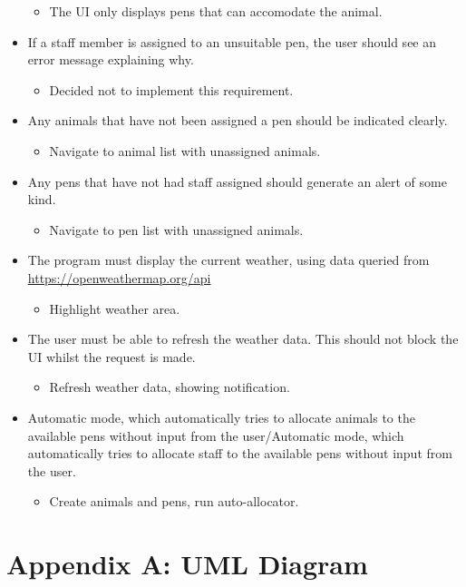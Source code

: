 \documentclass[english,a4paper,]{report}
\providecommand{\tightlist}{%
  \setlength{\itemsep}{0pt}\setlength{\parskip}{0pt}}
\begin{document}
\begin{itemize}
  \begin{itemize}
  \tightlist
  \item
    The UI only displays pens that can accomodate the animal.
  \end{itemize}
\item
  If a staff member is assigned to an unsuitable pen, the user should
  see an error message explaining why.

  \begin{itemize}
  \tightlist
  \item
    Decided not to implement this requirement.
  \end{itemize}
\item
  Any animals that have not been assigned a pen should be indicated
  clearly.

  \begin{itemize}
  \tightlist
  \item
    Navigate to animal list with unassigned animals.
  \end{itemize}
\item
  Any pens that have not had staff assigned should generate an alert of
  some kind.

  \begin{itemize}
  \tightlist
  \item
    Navigate to pen list with unassigned animals.
  \end{itemize}
\item
  The program must display the current weather, using data queried from
  \url{https://openweathermap.org/api}

  \begin{itemize}
  \tightlist
  \item
    Highlight weather area.
  \end{itemize}
\item
  The user must be able to refresh the weather data. This should not
  block the UI whilst the request is made.

  \begin{itemize}
  \tightlist
  \item
    Refresh weather data, showing notification.
  \end{itemize}
\item
  Automatic mode, which automatically tries to allocate animals to the
  available pens without input from the user/Automatic mode, which
  automatically tries to allocate staff to the available pens without
  input from the user.

  \begin{itemize}
  \tightlist
  \item
    Create animals and pens, run auto-allocator.
  \end{itemize}
\end{itemize}

\hypertarget{appendix-a-uml-diagram}{%
\chapter{Appendix A: UML Diagram}\label{appendix-a-uml-diagram}}
\end{document}
